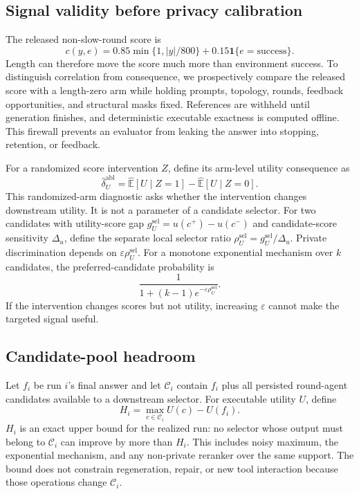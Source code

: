 \documentclass{article}
\begin{document}
\subsection{Signal validity before privacy calibration}

The released non-slow-round score is
\[
c(y,e)=0.85\min\{1,|y|/800\}+0.15\mathbf 1\{e=\mathrm{success}\}.
\]
Length can therefore move the score much more than environment success. To distinguish correlation from consequence, we prospectively compare the released score with a length-zero arm while holding prompts, topology, rounds, feedback opportunities, and structural masks fixed. References are withheld until generation finishes, and deterministic executable exactness is computed offline. This firewall prevents an evaluator from leaking the answer into stopping, retention, or feedback.

For a randomized score intervention $Z$, define its arm-level utility consequence as
\[
\widehat\delta_U^{\mathrm{abl}}=
\widehat{\mathbb E}[U\mid Z=1]-\widehat{\mathbb E}[U\mid Z=0].
\]
This randomized-arm diagnostic asks whether the intervention changes downstream utility. It is not a parameter of a candidate selector. For two candidates with utility-score gap $g_U^{\mathrm{sel}}=u(c^+)-u(c^-)$ and candidate-score sensitivity $\Delta_u$, define the separate local selector ratio $\rho_U^{\mathrm{sel}}=g_U^{\mathrm{sel}}/\Delta_u$. Private discrimination depends on $\varepsilon\rho_U^{\mathrm{sel}}$. For a monotone exponential mechanism over $k$ candidates, the preferred-candidate probability is
\[
\frac{1}{1+(k-1)e^{-\varepsilon\rho_U^{\mathrm{sel}}}}.
\]
If the intervention changes scores but not utility, increasing $\varepsilon$ cannot make the targeted signal useful.

\subsection{Candidate-pool headroom}

Let $f_i$ be run $i$'s final answer and let $\mathcal C_i$ contain $f_i$ plus all persisted round-agent candidates available to a downstream selector. For executable utility $U$, define
\[
H_i=\max_{c\in\mathcal C_i}U(c)-U(f_i).
\]
$H_i$ is an exact upper bound for the realized run: no selector whose output must belong to $\mathcal C_i$ can improve by more than $H_i$. This includes noisy maximum, the exponential mechanism, and any non-private reranker over the same support. The bound does not constrain regeneration, repair, or new tool interaction because those operations change $\mathcal C_i$.
\end{document}
